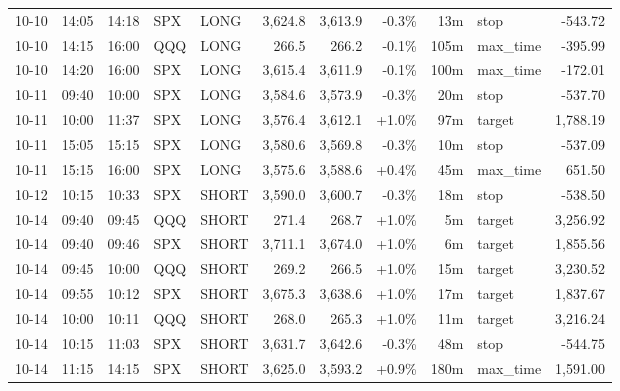 \documentclass[11pt,a4paper,twoside]{article}
\begin{document}
\begin{center}
\begin{longtable}{>{\color{txtmain}}l l l l l r r r r >{\color{txtmain}}l r}
10-10 & 14:05 & 14:18 & SPX & LONG & 3,624.8 & 3,613.9 & \textcolor{lossred}{-0.3\%} & 13m & stop & \textcolor{lossred}{-543.72} \\
10-10 & 14:15 & 16:00 & QQQ & LONG & 266.5 & 266.2 & \textcolor{lossred}{-0.1\%} & 105m & max\_time & \textcolor{lossred}{-395.99} \\
10-10 & 14:20 & 16:00 & SPX & LONG & 3,615.4 & 3,611.9 & \textcolor{lossred}{-0.1\%} & 100m & max\_time & \textcolor{lossred}{-172.01} \\
10-11 & 09:40 & 10:00 & SPX & LONG & 3,584.6 & 3,573.9 & \textcolor{lossred}{-0.3\%} & 20m & stop & \textcolor{lossred}{-537.70} \\
10-11 & 10:00 & 11:37 & SPX & LONG & 3,576.4 & 3,612.1 & \textcolor{wingreen}{+1.0\%} & 97m & target & \textcolor{wingreen}{1,788.19} \\
10-11 & 15:05 & 15:15 & SPX & LONG & 3,580.6 & 3,569.8 & \textcolor{lossred}{-0.3\%} & 10m & stop & \textcolor{lossred}{-537.09} \\
10-11 & 15:15 & 16:00 & SPX & LONG & 3,575.6 & 3,588.6 & \textcolor{wingreen}{+0.4\%} & 45m & max\_time & \textcolor{wingreen}{651.50} \\
10-12 & 10:15 & 10:33 & SPX & SHORT & 3,590.0 & 3,600.7 & \textcolor{lossred}{-0.3\%} & 18m & stop & \textcolor{lossred}{-538.50} \\
10-14 & 09:40 & 09:45 & QQQ & SHORT & 271.4 & 268.7 & \textcolor{wingreen}{+1.0\%} & 5m & target & \textcolor{wingreen}{3,256.92} \\
10-14 & 09:40 & 09:46 & SPX & SHORT & 3,711.1 & 3,674.0 & \textcolor{wingreen}{+1.0\%} & 6m & target & \textcolor{wingreen}{1,855.56} \\
10-14 & 09:45 & 10:00 & QQQ & SHORT & 269.2 & 266.5 & \textcolor{wingreen}{+1.0\%} & 15m & target & \textcolor{wingreen}{3,230.52} \\
10-14 & 09:55 & 10:12 & SPX & SHORT & 3,675.3 & 3,638.6 & \textcolor{wingreen}{+1.0\%} & 17m & target & \textcolor{wingreen}{1,837.67} \\
10-14 & 10:00 & 10:11 & QQQ & SHORT & 268.0 & 265.3 & \textcolor{wingreen}{+1.0\%} & 11m & target & \textcolor{wingreen}{3,216.24} \\
10-14 & 10:15 & 11:03 & SPX & SHORT & 3,631.7 & 3,642.6 & \textcolor{lossred}{-0.3\%} & 48m & stop & \textcolor{lossred}{-544.75} \\
10-14 & 11:15 & 14:15 & SPX & SHORT & 3,625.0 & 3,593.2 & \textcolor{wingreen}{+0.9\%} & 180m & max\_time & \textcolor{wingreen}{1,591.00} \\

\end{longtable}
\end{center}
\end{document}
